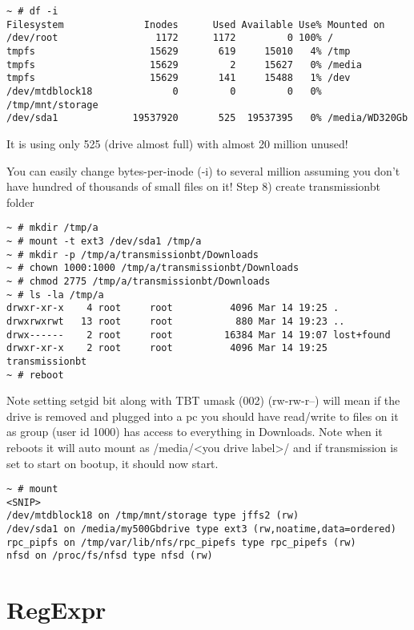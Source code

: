 \begin{itemize}
\begin{verbatim}
~ # df -i
Filesystem              Inodes      Used Available Use% Mounted on
/dev/root                 1172      1172         0 100% /
tmpfs                    15629       619     15010   4% /tmp
tmpfs                    15629         2     15627   0% /media
tmpfs                    15629       141     15488   1% /dev
/dev/mtdblock18              0         0         0   0% /tmp/mnt/storage
/dev/sda1             19537920       525  19537395   0% /media/WD320Gb
\end{verbatim}

It is using only 525 (drive almost full) with almost 20 million unused!

You can easily change bytes-per-inode (-i) to several million assuming you don't have hundred of thousands of small files on it!
Step 8) create transmissionbt folder

\begin{verbatim}
~ # mkdir /tmp/a
~ # mount -t ext3 /dev/sda1 /tmp/a
~ # mkdir -p /tmp/a/transmissionbt/Downloads
~ # chown 1000:1000 /tmp/a/transmissionbt/Downloads
~ # chmod 2775 /tmp/a/transmissionbt/Downloads
~ # ls -la /tmp/a
drwxr-xr-x    4 root     root          4096 Mar 14 19:25 .
drwxrwxrwt   13 root     root           880 Mar 14 19:23 ..
drwx------    2 root     root         16384 Mar 14 19:07 lost+found
drwxr-xr-x    2 root     root          4096 Mar 14 19:25 transmissionbt
~ # reboot
\end{verbatim}

    Note setting setgid bit along with TBT umask (002) (rw-rw-r--) will mean if the drive is removed and plugged into a pc you should have read/write to files on it as group (user id 1000) has access to everything in Downloads.
    Note when it reboots it will auto mount as /media/<you drive label>/ and if transmission is set to start on bootup, it should now start.

\begin{verbatim}
~ # mount
<SNIP>
/dev/mtdblock18 on /tmp/mnt/storage type jffs2 (rw)
/dev/sda1 on /media/my500Gbdrive type ext3 (rw,noatime,data=ordered)
rpc_pipfs on /tmp/var/lib/nfs/rpc_pipefs type rpc_pipefs (rw)
nfsd on /proc/fs/nfsd type nfsd (rw)
\end{verbatim}

\end{itemize}

\section{RegExpr}

